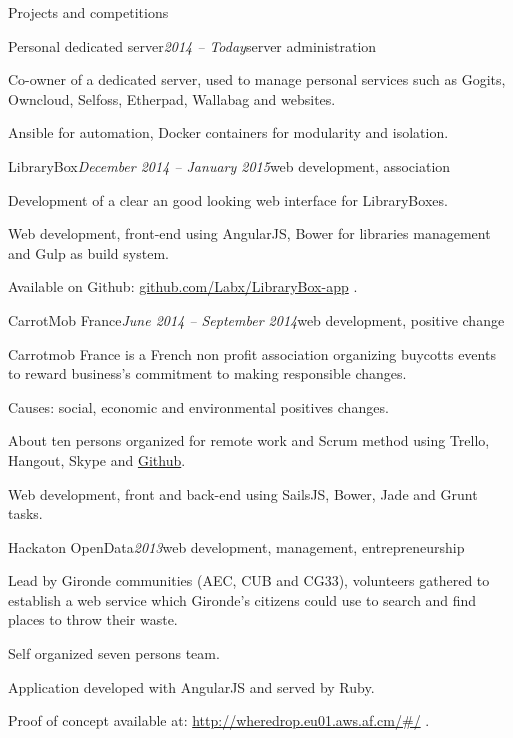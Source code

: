 \newpage

\begin{rSection}{Projects and competitions}

  \begin{rSubsection}{Personal dedicated server}{\em 2014 -- Today}{server administration}{}
    \item[] Co-owner of a dedicated server, used to manage personal services such as Gogits, Owncloud, Selfoss, Etherpad, Wallabag and websites.
    \item Ansible for automation, Docker containers for modularity and isolation.
  \end{rSubsection}

  \begin{rSubsection}{LibraryBox}{\em December 2014 -- January 2015}{web development, association}{}
    \item[] Development of a clear an good looking web interface for LibraryBoxes.
    \item Web development, front-end using AngularJS, Bower for libraries management and Gulp as build system.
    \item Available on Github: \href{https://github.com/Labx/LibraryBox-app}{github.com/Labx/LibraryBox-app} .
  \end{rSubsection}

  \begin{rSubsection}{CarrotMob France}{\em June 2014 -- September 2014}{web development, positive change}{}
    \item[] Carrotmob France is a French non profit association organizing buycotts events to reward business's commitment to making responsible changes.
    \item Causes: social, economic and environmental positives changes.
    \item About ten persons organized for remote work and Scrum method using Trello, Hangout, Skype and \href{https://github.com/carrotcommunity/carrotmobfrance}{Github}.
    \item Web development, front and back-end using SailsJS, Bower, Jade and Grunt tasks.
  \end{rSubsection}

  \begin{rSubsection}{Hackaton OpenData}{\em 2013}{web development, management, entrepreneurship}{}
    \item[] Lead by Gironde communities (AEC, CUB and CG33), volunteers gathered to establish a web service which Gironde's citizens could use to search and find places to throw their waste.
    \item Self organized seven persons team.
    \item Application developed with AngularJS and served by Ruby.
    \item Proof of concept available at: \href{http://wheredrop.eu01.aws.af.cm/#/}{http://wheredrop.eu01.aws.af.cm/\#/} .
  \end{rSubsection}


\end{rSection}
